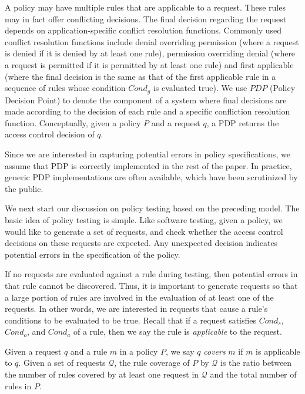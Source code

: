 A policy may have multiple rules that are applicable to a request.
These rules may in fact offer conflicting decisions. The final
decision regarding the request depends on application-specific
conflict resolution functions. Commonly used conflict resolution
functions include denial overriding permission (where a request is
denied if it is denied by at least one rule), permission overriding
denial (where a request is permitted if it is permitted by at least
one rule) and first applicable (where the final decision is the same
as that of the first applicable rule in a sequence of rules whose
condition $Cond_g$ is evaluated true). We use $PDP$ (Policy Decision
Point) to denote the component of a system where final decisions are
made according to the decision of each rule and a specific
confliction resolution function. Conceptually, given a policy $P$
and a request $q$, a PDP returns the access control decision of $q$.

Since we are interested in capturing potential errors in policy
specifications, we assume that PDP is correctly implemented in the
rest of the paper. In practice, generic PDP implementations are
often available, which have been scrutinized by the public.

We next start our discussion on policy testing based on the
preceding model. The basic idea of policy testing is simple. Like
software testing, given a policy, we would like to generate a set of
requests, and check whether the access control decisions on these
requests are expected. Any unexpected decision indicates potential
errors in the specification of the policy.

If no requests are evaluated against a rule during testing, then
potential errors in that rule cannot be discovered. Thus, it is
important to generate requests so that a large portion of rules are
involved in the evaluation of at least one of the requests. In other
words, we are interested in requests that cause a rule's conditions
to be evaluated to be true. Recall that if a request satisfies
$Cond_s$, $Cond_o$, and $Cond_a$ of a rule, then we say the rule is
{\em applicable} to the request.

\begin{definition}
Given a request $q$ and a rule $m$ in a policy $P$, we say $q$ {\em covers}
$m$ if $m$ is applicable to $q$.
Given a set of requests $\mathcal{Q}$, the
rule coverage of $P$ by $\mathcal{Q}$ is the ratio between
the number of rules covered by at least one request in $\mathcal{Q}$
and the total number of rules in $P$.
\end{definition}

